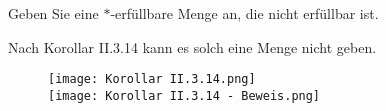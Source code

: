 
\begin{exercise}[26]

Geben Sie eine $\ast$-erfüllbare Menge an, die nicht erfüllbar ist.

\end{exercise}


\begin{solution}

\phantom{}

Nach Korollar II.3.14 kann es solch eine Menge nicht geben.


\begin{figure}
    \begin{boxedin}
        \begin{center}
            \texttt{[image: Korollar II.3.14.png]} \\
            \vspace{0.5 cm}
            \texttt{[image: Korollar II.3.14 - Beweis.png]}
        \end{center}
    \end{boxedin}
\end{figure}

\begin{comment}

Sei $\Sigma$ eine unerfüllbare Menge. Für eine beliebige Formel $\varphi \in \Sigma$ definieren wir mit
$M_\varphi$ eine äquivalente KNF. Weiters sei für eine ganze Teilmenge $\Theta \subseteq \Sigma$ die Menge
$M_\Theta := \bigcup_{\varphi \in \Theta} M_\varphi$. Es sei bemerkt, dass $M_\Theta$ erfüllbar ist, genau
dann wenn es eine Belegung gibt, sodass alle $M_\varphi$ erfüllbar sind und das ist genau dann der Fall,
wenn es eine Belegung gibt, sodass $\Theta$ erfüllbar ist. Da $\Sigma$ unerfüllbar ist, gilt das also auch
für $M_\Sigma$. Daher gibt es eine Resolutionswiderlegung $C_1, \dots, C_n$ von $M_\Sigma$. Sei die
endlichen Menge $M_0 \subseteq M_\Sigma$ die Menge aller von der Resolutionswiderlegung verwendeten
Klauseln. Da es für $M_0$ eine Resolutionswiderlegung gibt, ist $M_0$ unerfüllbar.
Da $M_0 \subset M_{\Sigma}$, ist zu jeder Formel $\varphi \in M_0$ die Menge
$\{\psi \in \Sigma: M_{\psi} = \varphi\}$ nicht leer. Nach dem Auswahlaxiom gibt es
eine Abbildung $f$ die jedem $\varphi \in M_0$ ein $\psi \in \Sigma$ zuordnet.
Das Bild $f(M_0)$ ist eine endliche Menge, welche aufgrund der Unerfüllbarkeit von $M_0$
ebenso wieder unerfüllbar ist. Daher ist $\Sigma$ nicht *-erfüllbar.

\end{comment}

\end{solution}

